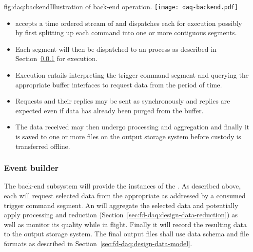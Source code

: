 \begin{dunefigure}{fig:daq:backend}{Illustration of   back-end operation.}
  \texttt{[image: daq-backend.pdf]}
\end{dunefigure}

\begin{itemize}
\item {} accepts a time ordered stream of  and dispatches each for execution possibly by first splitting up each command into one or more contiguous segments.
\item Each segment will then be dispatched to an  process as described in Section~\ref{sec:fd-daq:design-event-builder} for execution.
\item Execution entails interpreting the trigger command segment and querying the appropriate  buffer interfaces to request data from the period of time. 
\item Requests and their replies may be sent as synchronously and replies are expected even if data has already been purged from the  buffer.
\item The data received may then undergo processing and aggregation and finally it is saved to one or more files on the output storage system before custody is transferred offline.
\end{itemize}



\subsubsection{Event builder}
\label{sec:fd-daq:design-event-builder}

The  back-end subsystem will provide the instances of the .
As described above, each will request selected data from the appropriate  as addressed by a consumed trigger command segment. 
An  will aggregate the selected data and potentially apply processing and reduction (Section~\ref{sec:fd-daq:design-data-reduction}) as well as monitor its quality while in flight.
Finally it will record the resulting data to the output storage system.
The final output files shall use data schema and file formats as described in Section~\ref{sec:fd-daq:design-data-model}.



